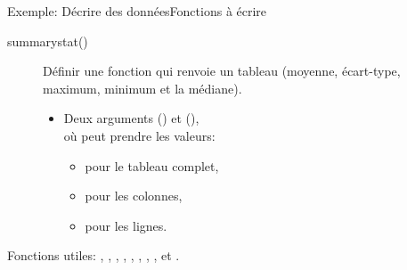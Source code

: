 \begin{frame}[containsverbatim]{\textcolor{goldenrod2}{Exemple:} Décrire des données}{Fonctions à écrire}
    \begin{description}
        \item[summarystat()] Définir une fonction qui renvoie un tableau (moyenne, écart-type, maximum, minimum  et la médiane).
        \vspace{2ex}
            \begin{itemize}
                \item Deux arguments  () et  (),\\
                    où  peut prendre les valeurs:
                    \begin{itemize}
                        \item {} pour le tableau complet,
                        \item {} pour les colonnes,
                        \item {} pour les lignes.
                    \end{itemize}
            \end{itemize}
    \end{description}
\vspace{2ex}
\par{Fonctions utiles: , , , , , , , ,  et .}
\end{frame}


